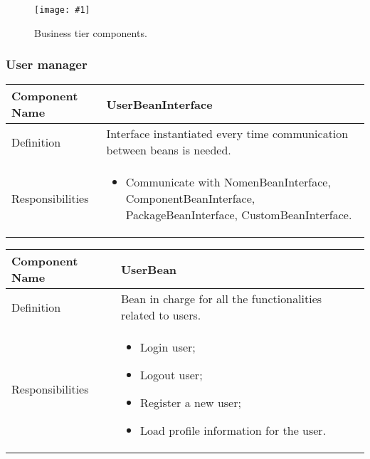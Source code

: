 \documentclass[a4paper,12pt]{book}
\newcommand{\insimg}[3]{
  \begin{figure}[H]
    \begin{center}
      \texttt{[image: \#1]}
    \end{center}
    \caption{#2}
    \label{fig:#1}
  \end{figure}
}
\begin{document}
\insimg{business-tier}{Business tier components.}{0.46}

\subsubsection{User manager}
\begin{center}
  \begin{tabular}{ | p{3.3cm} | p{11.7cm} | }
    \hline
    Component Name & \textbf{UserBeanInterface} \\ \hline
    Definition & Interface instantiated every time communication between beans is needed. \\ \hline
    Responsibilities & \parbox{0.65\textwidth}{
      \begin{itemize}[noitemsep,leftmargin=*]
        \item Communicate with NomenBeanInterface, ComponentBeanInterface, PackageBeanInterface, CustomBeanInterface.
      \end{itemize}} \\ \hline
    \end{tabular}
  \end{center}
\begin{center}
  \begin{tabular}{ | p{3.3cm} | p{11.7cm} | }
    \hline
    Component Name & \textbf{UserBean} \\ \hline
    Definition & Bean in charge for all the functionalities related to users. \\ \hline
    Responsibilities & \parbox{0.65\textwidth}{
      \begin{itemize}[noitemsep,leftmargin=*]
        \item Login user;
        \item Logout user;
        \item Register a new user;
        \item Load profile information for the user.
      \end{itemize}} \\ \hline
    \end{tabular}
  \end{center}
\end{document}
